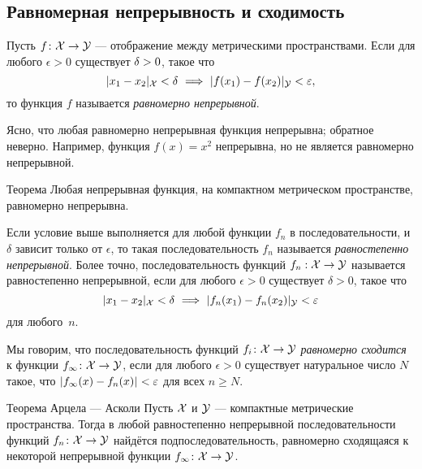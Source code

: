 \begin{multicols}{2}
{\subsection*{Равномерная непрерывность и сходимость}

Пусть $f\colon{\mathcal{X}}\to \mathcal{Y}$ --- отображение между метрическими пространствами.
Если для любого $\epsilon>0$ существует $\delta\z>0$, такое что
\[\dist{x_1}{x_2}{\spc{X}}<\delta\ \Longrightarrow\ \dist{f(x_1)}{f(x_2)}{\spc{Y}}<\epsilon,\]
то функция $f$ называется \emph{равномерно непрерывной}.

Ясно, что любая равномерно непрерывная функция непрерывна;
обратное неверно.
Например, функция $f(x)=x^2$ непрерывна, но не является равномерно непрерывной.

{\sloppy

\begin{thm}{Теорема}
Любая непрерывная функция, на компактном метрическом пространстве, равномерно непрерывна.
\end{thm}

}

Если условие выше выполняется для любой функции $f_n$ в последовательности, и $\delta$ зависит только от $\epsilon$,
то такая последовательность $f_n$ называется \emph{равностепенно непрерывной}.
Более точно, 
последовательность функций $f_n:{\mathcal{X}}\to \mathcal{Y}$ называется равностепенно непрерывной, если 
для любого $\epsilon>0$ существует $\delta>0$, такое что 
\[\dist{x_1}{x_2}{\spc{X}}<\delta\ \Longrightarrow\ \dist{f_n(x_1)}{f_n(x_2)}{\spc{Y}}<\epsilon\]
для любого~$n$.

Мы говорим, что последовательность функций $f_i\colon {\mathcal{X}} \to \mathcal{Y}$ \emph{равномерно сходится} к функции $f_{\infty}\colon {\mathcal{X}} \to \mathcal{Y}$, если для любого 
$\epsilon>0$ существует натуральное число $N$ такое, что $\dist{f_{\infty}(x)}{f_n (x)}{}<\epsilon$ для всех $n \ge N$.

{\sloppy

\begin{thm}{Теорема Арцела --- Асколи}\label{lem:equicontinuous}
Пусть $\mathcal{X}$ и $\mathcal{Y}$ --- компактные метрические пространства. 
Тогда в любой равностепенно непрерывной последовательности функций $f_n\:\spc{X}\z\to \spc{Y}$ найдётся подпоследовательность, равномерно сходящаяся к некоторой непрерывной функции $f_\infty\:\spc{X}\z\to \spc{Y}$. 
\end{thm}

}}
\end{multicols}
